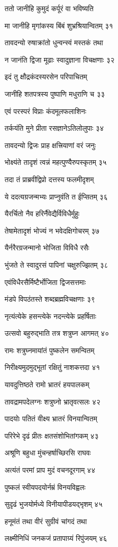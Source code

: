 ततो जानीहि कुमुदं कर्पूरं वा भविष्यति

मा जानीहि मृगांकस्य बिंबं शुभ्रश्रियान्वितम् ३१

तावदन्यो रुषाक्रांतो धुन्वन्स्वं मस्तकं तथा

न जानंति द्विजा मूढाः स्वादुज्ञाना विचक्षणाः ३२

इदं तु क्षौद्रकंदस्यरसेन परिपाचितम्

जानीहि शतपत्रस्य पुष्पाणि मधुराणि च ३३

एवं परस्परं विप्राः कंदमूलफलाशिनः

तर्कयंति मुने प्रीता रसज्ञानेऽतिलोलुपाः ३४

तावदन्यो द्विजः प्राह क्षत्त्रियाणां वरं जनुः

भोक्ष्यंते तादृशं त्वन्नं महत्पुण्यैरुपस्कृतम् ३५

तदा तं प्राब्रवीद्विप्रो दत्तस्य फलमीदृशम्

ये ददत्यग्रजन्मभ्यः प्राप्नुवंति त ईप्सितम् ३६

यैरर्चितो नैव हरिर्नैवेद्यैर्विविधैर्मुहुः

तेषामेतादृशं भोज्यं न भवेदक्षिगोचरम् ३७

यैर्नरैरग्रजन्मानो भोजिता विविधै रसैः

भुंजते ते स्वादुरसं पापिनां चक्षुरुज्झितम् ३८

एवंविधैरसैर्मिष्टैर्भोजिता द्विजसत्तमाः

मंडपे विपठंतस्ते शब्दब्रह्मविचक्षणाः ३९

नृत्यंत्येके हसन्त्येके नदन्त्येके प्रहर्षिताः

उत्सवो बहुरुद्भाति तत्र शत्रुघ्न आगमत् ४०

रामः शत्रुघ्नमायांतं पुष्कलेन समन्वितम्

निरीक्ष्यमुदमुद्भूतां रक्षितुं नाशकत्तदा ४१

यावदुत्तिष्ठते रामो भ्रातरं हयपालकम्

तावद्रामपदेलग्नः शत्रुघ्नो भ्रातृवत्सलः ४२

पादयोः पतितं वीक्ष्य भ्रातरं विनयान्वितम्

परिरेभे दृढं प्रीतः क्षतसंशोभितांगकम् ४३

अश्रूणि बहुधा मुंचन्हर्षाच्छिरसि राघवः

अत्यंतं परमां प्राप मुदं वचनदूरगाम् ४४

पुष्कलं स्वीयपदयोर्नम्रं विनयविह्वलः

सुदृढं भुजयोर्मध्ये विनीयापीडयद्भृशम् ४५

हनूमंतं तथा वीरं सुग्रीवं चांगदं तथा

लक्ष्मीनिधिं जनकजं प्रतापाग्र्यं रिपुंजयम् ४६

